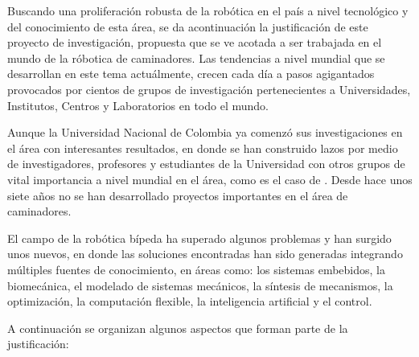 Buscando una proliferaci\'on robusta de la rob\'otica en el pa\'is a nivel tecnol\'ogico y del conocimiento de esta \'area, se da acontinuaci\'on la justificaci\'on de este proyecto de investigaci\'on, propuesta que se ve acotada a ser trabajada en el mundo de la r\'obotica de caminadores.  Las tendencias a nivel mundial que se desarrollan en este tema actu\'almente, crecen cada d\'ia a pasos agigantados provocados por cientos de grupos de investigaci\'on pertenecientes a Universidades, Institutos, Centros y Laboratorios en todo el mundo.\par
Aunque la Universidad Nacional de Colombia ya comenz\'o sus investigaciones en el \'area con interesantes resultados\cite{M2005,M2005a,Roa2006,Heredia2007}, en donde se han construido lazos por medio de investigadores, profesores y estudiantes de la Universidad con otros grupos de vital importancia a nivel mundial en el \'area, como es el caso de \cite{Englsberger2011,Ott2011,M2013}. Desde hace unos siete a\~nos no se han desarrollado proyectos importantes en el \'area de caminadores.\par
El campo de la rob\'otica b\'ipeda ha superado algunos problemas y han surgido unos nuevos, en donde las soluciones encontradas han sido generadas integrando m\'ultiples fuentes de conocimiento, en \'areas como: los sistemas embebidos\cite{Barker2010,Pan2010,Kimm2012,Wang2011,Amir2013}, la biomec\'anica\cite{Mahmoodi2013,Lim2014,Wu2013,Aoustin2013,Chiang2013,Xiang2010,Hobon2014}, el modelado de sistemas mec\'anicos\cite{Chiang2013}, la s\'intesis de mecanismos\cite{Li2008,Aoustin2013,Wu2013a,Xu2013,Hobon2014}, la optimizaci\'on\cite{Xiang2010,Lim2014,Kherici2014,Mahmoodabadi2014}, la computaci\'on flexible\cite{Wang2013,Kherici2014,Mahmoodabadi2014}, la inteligencia artificial\cite{Treesatayapun2014,Yuan2014,Wu2014,Wang2013} y el control\cite{Dou2013,Treesatayapun2014,Yuan2014,Wu2014}.\par
A continuaci\'on se organizan algunos aspectos que forman parte de la justificaci\'on:
